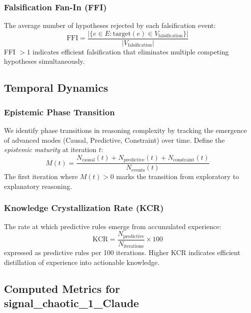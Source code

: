 \documentclass[10pt,twocolumn]{article}
\begin{document}
\subsubsection{Falsification Fan-In (FFI)}

The average number of hypotheses rejected by each falsification event:
\begin{equation}
    \text{FFI} = \frac{|\{e \in E : \text{target}(e) \in V_{\text{falsification}}\}|}{|V_{\text{falsification}}|}
\end{equation}
FFI $> 1$ indicates efficient falsification that eliminates multiple competing hypotheses simultaneously.

\subsection{Temporal Dynamics}

\subsubsection{Epistemic Phase Transition}

We identify phase transitions in reasoning complexity by tracking the emergence of advanced modes (Causal, Predictive, Constraint) over time. Define the \emph{epistemic maturity} at iteration $t$:
\begin{equation}
    M(t) = \frac{N_{\text{causal}}(t) + N_{\text{predictive}}(t) + N_{\text{constraint}}(t)}{N_{\text{events}}(t)}
\end{equation}
The first iteration where $M(t) > 0$ marks the transition from exploratory to explanatory reasoning.

\subsubsection{Knowledge Crystallization Rate (KCR)}

The rate at which predictive rules emerge from accumulated experience:
\begin{equation}
    \text{KCR} = \frac{N_{\text{predictive}}}{N_{\text{iterations}}} \times 100
\end{equation}
expressed as predictive rules per 100 iterations. Higher KCR indicates efficient distillation of experience into actionable knowledge.

\subsection{Computed Metrics for signal\_chaotic\_1\_Claude}
\end{document}
